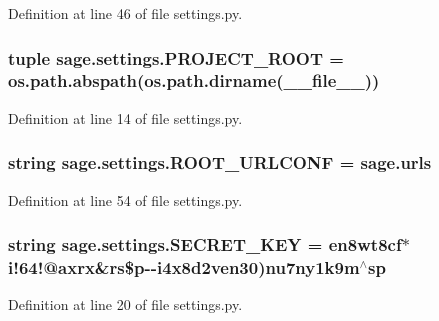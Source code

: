 Definition at line 46 of file settings.\+py.

\hypertarget{a00043_ae2e71004e0684c0243b4e9792726cd0f}{}
\subsubsection[{P\+R\+O\+J\+E\+C\+T\+\_\+\+R\+O\+O\+T}]{\setlength{\rightskip}{0pt plus 5cm}tuple sage.\+settings.\+P\+R\+O\+J\+E\+C\+T\+\_\+\+R\+O\+O\+T = os.\+path.\+abspath(os.\+path.\+dirname(\+\_\+\+\_\+file\+\_\+\+\_\+))}\label{a00043_ae2e71004e0684c0243b4e9792726cd0f}


Definition at line 14 of file settings.\+py.

\hypertarget{a00043_a92b3d804acae3871a9877ad143df4201}{}
\subsubsection[{R\+O\+O\+T\+\_\+\+U\+R\+L\+C\+O\+N\+F}]{\setlength{\rightskip}{0pt plus 5cm}string sage.\+settings.\+R\+O\+O\+T\+\_\+\+U\+R\+L\+C\+O\+N\+F = \textquotesingle{}sage.\+urls\textquotesingle{}}\label{a00043_a92b3d804acae3871a9877ad143df4201}


Definition at line 54 of file settings.\+py.

\hypertarget{a00043_acc7cb44e3d92fc1334c19318ede49bc8}{}
\subsubsection[{S\+E\+C\+R\+E\+T\+\_\+\+K\+E\+Y}]{\setlength{\rightskip}{0pt plus 5cm}string sage.\+settings.\+S\+E\+C\+R\+E\+T\+\_\+\+K\+E\+Y = \textquotesingle{}en8wt8cf$\ast$i!64!@axrx\&rs\$p-\/-\/i4x8d2ven30)nu7ny1k9m$^\wedge$sp\textquotesingle{}}\label{a00043_acc7cb44e3d92fc1334c19318ede49bc8}


Definition at line 20 of file settings.\+py.

